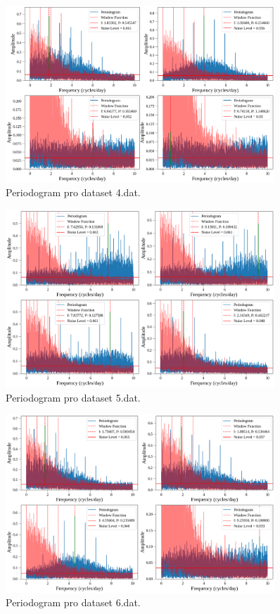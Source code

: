 \documentclass[a4paper,11pt,twocolumn]{article}
\begin{document}
    \begin{figure}
        \centering
        \includegraphics[width=0.9\textwidth]{period/4_per.png}
        \caption{Periodogram pro dataset 4.dat.}
        \label{fig:4_per}
    \end{figure}

    \begin{figure}
        \centering
        \includegraphics[width=0.9\textwidth]{period/5_per.png}
        \caption{Periodogram pro dataset 5.dat.}
        \label{fig:5_per}
    \end{figure}

    \begin{figure}
        \centering
        \includegraphics[width=0.9\textwidth]{period/6_per.png}
        \caption{Periodogram pro dataset 6.dat.}
        \label{fig:6_per}
    \end{figure}
\end{document}
